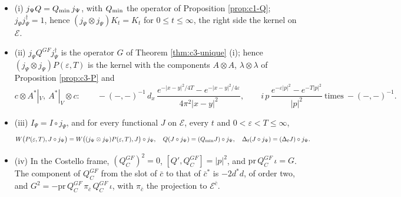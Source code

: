 \begin{theorem}
\label{thm:c3-pullback}
\begin{itemize}
\item (i) $j_\Psi Q=Q_{\rm min}\,j_\Psi$, with $Q_{\rm min}$ the operator of Proposition \ref{prop:c1-Q}; $j_\Psi j_\Psi^\dagger=1$, hence $(j_\Psi\otimes j_\Psi)K_t=K_t$ for $0\le t\le\infty$, the right side the kernel on $\mathscr E$.
\item (ii) $j_\Psi Q^{GF}j_\Psi^\dagger$ is the operator $G$ of Theorem \ref{thm:c3-unique} (i); hence $(j_\Psi\otimes j_\Psi)P(\varepsilon,T)$ is the kernel with the components $A\otimes A$, $\lambda\otimes\lambda$ of Proposition \ref{prop:c3-P} and
\[
c\otimes A^*|_V,\ A^*|_V\otimes c:\qquad -(-,-)^{-1}\,d_x\,\frac{e^{-|x-y|^2/4T}-e^{-|x-y|^2/4\varepsilon}}{4\pi^2|x-y|^2},\qquad i\,p\,\frac{e^{-\varepsilon|p|^2}-e^{-T|p|^2}}{|p|^2}\ \text{times}\ -(-,-)^{-1}.
\]
\item (iii) $I_\Psi=I\circ j_\Psi$, and for every functional $J$ on $\mathscr E$, every $t$ and $0<\varepsilon<T\le\infty$,
\[
W\big(P(\varepsilon,T),J\circ j_\Psi\big)=W\big((j_\Psi\otimes j_\Psi)P(\varepsilon,T),J\big)\circ j_\Psi,\quad Q(J\circ j_\Psi)=(Q_{\rm min}J)\circ j_\Psi,\quad \Delta_t(J\circ j_\Psi)=(\Delta_tJ)\circ j_\Psi .
\]
\item (iv) In the Costello frame, $(Q^{GF}_C)^2=0$, $[Q',Q^{GF}_C]=|p|^2$, and $\mathrm{pr}\,Q^{GF}_C\,\iota=G$. The component of $Q^{GF}_C$ from the slot of $\bar c$ to that of $\bar c^*$ is $-2d^*d$, of order two, and $G^2=-\mathrm{pr}\,Q^{GF}_C\,\pi_{\bar c}\,Q^{GF}_C\,\iota$, with $\pi_{\bar c}$ the projection to $\mathscr E^{\bar c}$.
\end{itemize}
\end{theorem}

